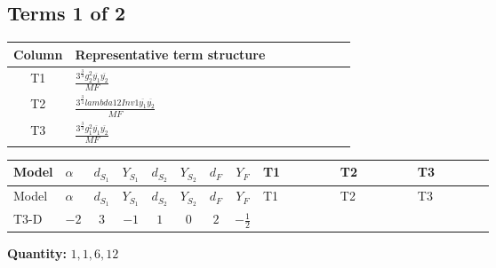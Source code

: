 \documentclass[8pt]{article}
\begin{document}
\begin{landscape}
\subsection*{Terms 1 of 2}
\begin{center}
\begin{tabular}{@{}c >{\raggedright\arraybackslash}p{0.82\linewidth}@{}}
\toprule
Column & Representative term structure \\
\midrule
T1 & \(\displaystyle \frac{3^{\frac{3}{4}} g_{2}^{2} \overline{y_{1}} \overline{y_{2}}}{MF}\) \\
\midrule
T2 & \(\displaystyle \frac{3^{\frac{3}{4}} lambda12Inv1 \overline{y_{1}} \overline{y_{2}}}{MF}\) \\
\midrule
T3 & \(\displaystyle \frac{3^{\frac{3}{4}} g_{1}^{2} \overline{y_{1}} \overline{y_{2}}}{MF}\) \\
\midrule
\bottomrule
\end{tabular}
\end{center}
\smallskip
\tiny
\begin{longtable}{@{}llcccccc >{\raggedright\arraybackslash}p{0.21\linewidth} >{\raggedright\arraybackslash}p{0.21\linewidth} >{\raggedright\arraybackslash}p{0.21\linewidth}@{}}
\toprule
Model & $\alpha$ & $d_{S_1}$ & $Y_{S_1}$ & $d_{S_2}$ & $Y_{S_2}$ & $d_F$ & $Y_F$ & T1 & T2 & T3 \\
\midrule
\endfirsthead
\toprule
Model & $\alpha$ & $d_{S_1}$ & $Y_{S_1}$ & $d_{S_2}$ & $Y_{S_2}$ & $d_F$ & $Y_F$ & T1 & T2 & T3 \\
\midrule
\endhead
T3-D & $-2$ & $3$ & $-1$ & $1$ & $0$ & $2$ & $-\frac{1}{2}$ & \scriptsize\adjustbox{max width=\linewidth}{$\begin{gathered} - \frac{17 \cdot 3^{\frac{3}{4}} g_{2}^{2} \overline{y_{1}} \overline{y_{2}}}{24 MF}\end{gathered}$} & \scriptsize\adjustbox{max width=\linewidth}{$\begin{gathered} - \frac{3^{\frac{3}{4}} lambda12Inv1 \overline{y_{1}} \overline{y_{2}}}{6 MF}\end{gathered}$} & \scriptsize\adjustbox{max width=\linewidth}{$\begin{gathered} - \frac{3^{\frac{3}{4}} g_{1}^{2} \overline{y_{1}} \overline{y_{2}}}{8 MF}\end{gathered}$} \\
\midrule
\bottomrule
\end{longtable}
\clearpage
\noindent\textbf{Quantity: }$\mathrm{1,1,6,12}$\par\smallskip

\end{landscape}
\end{document}
